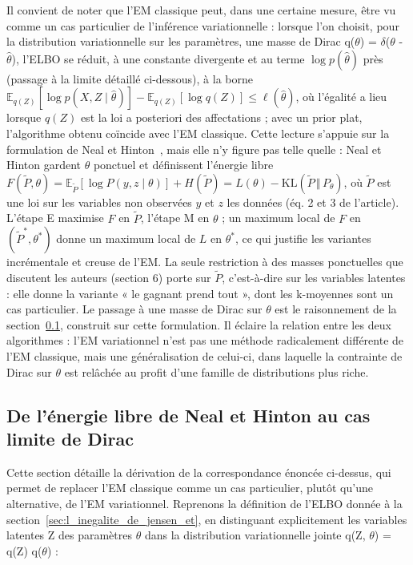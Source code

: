 Il convient de noter que l'EM classique peut, dans une certaine mesure, être vu comme un cas particulier de l'inférence variationnelle : lorsque l'on choisit, pour la distribution variationnelle sur les paramètres, une masse de Dirac q($\theta $) = $\delta $($\theta $ - $\hat{\theta }$), l'ELBO se réduit, à une constante divergente et au terme $\log p(\hat\theta)$ près (passage à la limite détaillé ci-dessous), à la borne $\mathbb{E}_{q(Z)}[\log p(X, Z \mid \hat\theta)] - \mathbb{E}_{q(Z)}[\log q(Z)] \leq \ell(\hat\theta)$, où l'égalité a lieu lorsque $q(Z)$ est la loi a posteriori des affectations ; avec un prior plat, l'algorithme obtenu coïncide avec l'EM classique. Cette lecture s'appuie sur la formulation de Neal et Hinton~\cite{neal1998}, mais elle n'y figure pas telle quelle : Neal et Hinton gardent $\theta$ ponctuel et définissent l'énergie libre $F(\tilde P, \theta) = \mathbb{E}_{\tilde P}[\log P(y, z \mid \theta)] + H(\tilde P) = L(\theta) - \mathrm{KL}(\tilde P \,\Vert\, P_\theta)$, où $\tilde P$ est une loi sur les variables non observées $y$ et $z$ les données (éq. 2 et 3 de l'article). L'étape E maximise $F$ en $\tilde P$, l'étape M en $\theta$ ; un maximum local de $F$ en $(\tilde P^*, \theta^*)$ donne un maximum local de $L$ en $\theta^*$, ce qui justifie les variantes incrémentale et creuse de l'EM. La seule restriction à des masses ponctuelles que discutent les auteurs (section 6) porte sur $\tilde P$, c'est-à-dire sur les variables latentes : elle donne la variante « le gagnant prend tout », dont les k-moyennes sont un cas particulier. Le passage à une masse de Dirac sur $\theta$ est le raisonnement de la section~\ref{sec:de_l_energie_libre_de}, construit sur cette formulation. Il éclaire la relation entre les deux algorithmes : l'EM variationnel n'est pas une méthode radicalement différente de l'EM classique, mais une généralisation de celui-ci, dans laquelle la contrainte de Dirac sur $\theta $ est relâchée au profit d'une famille de distributions plus riche.

\subsection{De l'énergie libre de Neal et Hinton au cas limite de Dirac}\label{sec:de_l_energie_libre_de}
Cette section détaille la dérivation de la correspondance énoncée ci-dessus, qui permet de replacer l'EM classique comme un cas particulier, plutôt qu'une alternative, de l'EM variationnel. Reprenons la définition de l'ELBO donnée à la section~\ref{sec:l_inegalite_de_jensen_et}, en distinguant explicitement les variables latentes Z des paramètres $\theta $ dans la distribution variationnelle jointe q(Z, $\theta $) = q(Z) q($\theta $) :

